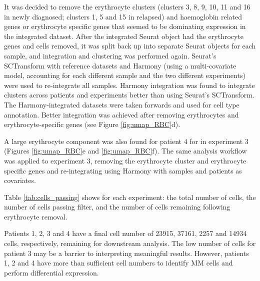 It was decided to remove the erythrocyte clusters (clusters 3, 8, 9, 10, 11 and 16 in newly diagnosed; clusters 1, 5 and 15 in relapsed) and haemoglobin related genes or erythrocyte specific genes that seemed to be dominating expression in the integrated dataset.
After the integrated Seurat object had the erythrocyte genes and cells removed, it was split back up into separate Seurat objects for each sample, and integration and clustering was performed again.
Seurat's SCTransform with reference datasets and Harmony (using a multi-covariate model, accounting for each different sample and the two different experiments) were used to re-integrate all samples.
Harmony integration was found to integrate clusters across patients and experiments better than using Seurat's SCTransform.
The Harmony-integrated datasets were taken forwards and used for cell type annotation.
Better integration was achieved after removing erythrocytes and erythrocyte-specific genes (see Figure \ref{fig:umap_RBC}d).

A large erythrocyte component was also found for patient 4 for in experiment 3 (Figures \ref{fig:umap_RBC}e and \ref{fig:umap_RBC}f).
The same analysis workflow was applied to experiment 3, removing the erythrocyte cluster and erythrocyte specific genes and re-integrating using Harmony with samples and patients as covariates.

Table \ref{tab:cells_passing} shows for each experiment: the total number of cells, the number of cells passing filter, and the number of cells remaining following erythrocyte removal.

Patients 1, 2, 3 and 4 have a final cell number of 23915, 37161, 2257 and 14934 cells, respectively, remaining for downstream analysis.
The low number of cells for patient 3 may be a barrier to interpreting meaningful results.
However, patients 1, 2 and 4 have more than sufficient cell numbers to identify MM cells and perform differential expression.


